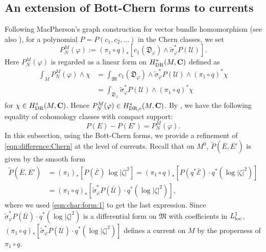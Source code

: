 \documentclass[amscd, leqno]{amsart}
\theoremstyle{plain}
\theoremstyle{definition}
\theoremstyle{remark}
\begin{document}
\subsection
{An extension of Bott-Chern forms to currents}
\label{sect:6.3}
\par
Following MacPherson's graph construction for vector bundle homomorphism  \cite[Example 18.1.6]{Fulton98}
(see also \cite[p.341 Eq.(14) and Def.\,18.1]{Fulton98}), for a polynomial $P=P(c_{1},c_{2},\ldots)$ in the Chern classes, we set
\begin{equation}
\label{eqn:local:Chern}
P^{M}_{N}(\varphi)
:=
(\pi_{1}\circ q)_{*}\left[c_{1}({\mathfrak D}_{\varphi}) \wedge \widetilde{\sigma}_{\varphi}^{*} P({\mathscr U})\right].
\end{equation}
Here $P^{M}_{N}(\varphi)$ is regarded as a linear form on $H^{*}_{\rm DR}(M, {\mathbf C})$ defined as
\begin{equation}
\label{eqn:def:local:Chern}
\begin{aligned}
\int_{M} P^{M}_{N}(\varphi) \wedge \chi
&=
\int_{\mathfrak M} 
c_{1}({\mathfrak D}_{\varphi}) \wedge \widetilde{\sigma}_{\varphi}^{*} P({\mathscr U}) \wedge (\pi_{1}\circ q)^{*}\chi
\\
&=
\int_{{\mathfrak D}_{\varphi}} \widetilde{\sigma}_{\varphi}^{*} P( {\mathscr U} ) \wedge (\pi_{1}\circ q)^{*}\chi
\end{aligned}
\end{equation}
for $\chi \in H^{*}_{\rm DR}(M, {\mathbf C})$. Hence $P^{M}_{N}(\varphi) \in H^{*}_{{\rm DR},c}(M, {\mathbf C})$.
By \cite[Example 18.1.6 (c)]{Fulton98}, we have the following equality of cohomology classes with compact support:
\begin{equation}
\label{eqn:difference:Chern}
P(E) - P(E') = P^{M}_{N}(\varphi).
\end{equation}
In this subsection, using the Bott-Chern forms, we provide a refinement of \eqref{eqn:difference:Chern} at the level of currents.
Recall that on $M^{0}$, $\widetilde{P}(\overline{E},\overline{E'})$ is given by the smooth form 
\begin{equation}
\label{eqn:def:Bott:Chern}
\begin{aligned}
\widetilde{P}(\overline{E},\overline{E'})
&=
(\pi_{1})_{*}\left[ P(\overline{\mathcal E})\,\log|\zeta|^{2} \right]
=
(\pi_{1}\circ q)_{*}\left[ P(q^{*}\overline{\mathcal E})\cdot q^{*}(\log|\zeta|^{2}) \right]
\\
&=
(\pi_{1}\circ q)_{*}\left[ \widetilde{\sigma}_{\varphi}^{*} P(\overline{\mathscr U})\cdot q^{*}(\log|\zeta|^{2}) \right],
\end{aligned}
\end{equation}
where we used \eqref{eqn:char:form:1} to get the last expression. 
Since $\widetilde{\sigma}_{\varphi}^{*}P(\overline{\mathscr U})\cdot q^{*}(\log|\zeta|^{2})$ is a differential form on ${\mathfrak M}$ 
with coefficients in $L^{1}_{\rm loc}$, $(\pi_{1}\circ q)_{*}[\widetilde{\sigma}_{\varphi}^{*}P(\overline{\mathscr U})\cdot q^{*}(\log|\zeta|^{2})]$ 
defines a current on $M$ by the properness of $\pi_{1}\circ q$.
\end{document}
